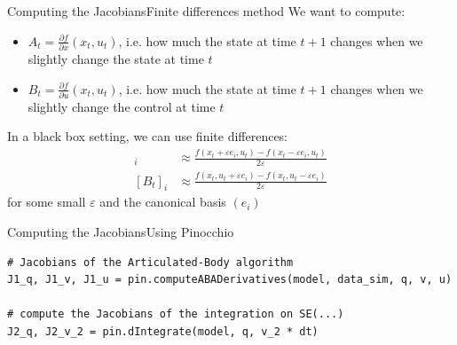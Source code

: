 \documentclass[aspectratio=169,draft]{beamer}
\begin{document}
\begin{frame}{Computing the Jacobians}{Finite differences method}
    We want to compute:
    \begin{itemize}
        \item $A_t=\frac{\partial f}{\partial x}(x_t, u_t)$, i.e. how much the state at time $t+1$ changes when we slightly change the state at time $t$
        \item $B_t=\frac{\partial f}{\partial u}(x_t, u_t)$, i.e. how much the state at time $t+1$ changes when we slightly change the control at time $t$
    \end{itemize}
    In a black box setting, we can use finite differences:
    \begin{align*}
        [A_t]_i & \approx \frac{f(x_t+\varepsilon e_i, u_t)-f(x_t-\varepsilon e_i, u_t)}{2\varepsilon} \\
        [B_t]_i & \approx \frac{f(x_t, u_t+\varepsilon e_i)-f(x_t, u_t-\varepsilon e_i)}{2\varepsilon}
    \end{align*}
    for some small $\varepsilon$ and the canonical basis $(e_i)$
\end{frame}

\begin{frame}[fragile]{Computing the Jacobians}{Using Pinocchio}
    \begin{verbatim}
# Jacobians of the Articulated-Body algorithm
J1_q, J1_v, J1_u = pin.computeABADerivatives(model, data_sim, q, v, u)

# compute the Jacobians of the integration on SE(...)
J2_q, J2_v_2 = pin.dIntegrate(model, q, v_2 * dt)
    \end{verbatim}
\end{frame}
\end{document}
